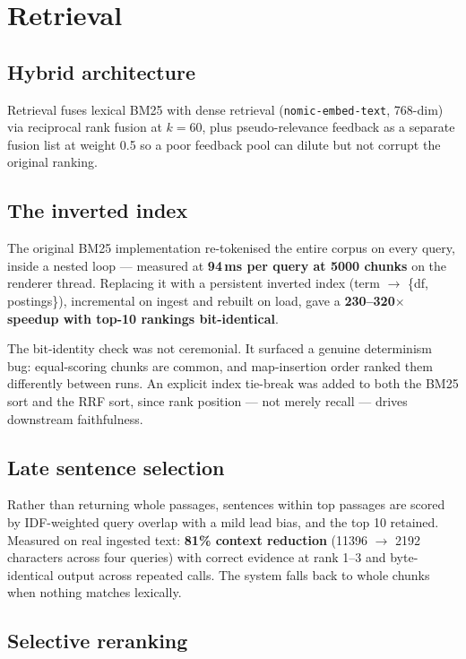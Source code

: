 \documentclass[10pt,twocolumn]{article}
\newcommand{\code}[1]{\texttt{\small #1}}
\begin{document}
\section{Retrieval}
\label{sec:rag}

\subsection{Hybrid architecture}

Retrieval fuses lexical BM25 with dense retrieval (\code{nomic-embed-text}, 768-dim) via
reciprocal rank fusion at $k=60$, plus pseudo-relevance feedback as a separate fusion
list at weight 0.5 so a poor feedback pool can dilute but not corrupt the original
ranking.

\subsection{The inverted index}

The original BM25 implementation re-tokenised the entire corpus on every query, inside a
nested loop --- measured at \textbf{94\,ms per query at 5000 chunks} on the renderer
thread. Replacing it with a persistent inverted index (term $\to$ \{df, postings\}),
incremental on ingest and rebuilt on load, gave a \textbf{230--320$\times$ speedup with
top-10 rankings bit-identical}.

The bit-identity check was not ceremonial. It surfaced a genuine determinism bug:
equal-scoring chunks are common, and map-insertion order ranked them differently between
runs. An explicit index tie-break was added to both the BM25 sort and the RRF sort, since
rank position --- not merely recall --- drives downstream faithfulness.

\subsection{Late sentence selection}

Rather than returning whole passages, sentences within top passages are scored by
IDF-weighted query overlap with a mild lead bias, and the top 10 retained. Measured on
real ingested text: \textbf{81\% context reduction} (11396 $\to$ 2192 characters across
four queries) with correct evidence at rank 1--3 and byte-identical output across
repeated calls. The system falls back to whole chunks when nothing matches lexically.

\subsection{Selective reranking}
\end{document}
